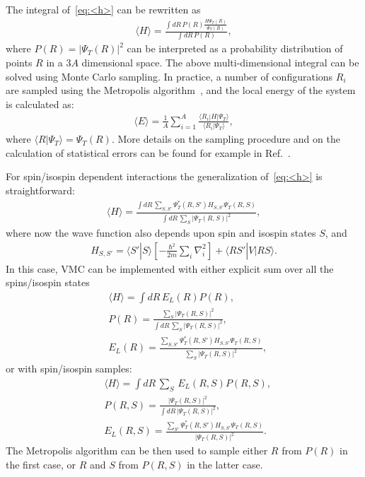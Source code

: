\documentclass[aps,prc,twocolumn,superscriptaddress,floatfix]{revtex4-1}
\newcommand{\red}[1]{\protect\textcolor{red}{#1}}
\begin{document}
The integral of~\cref{eq:<h>} can be rewritten as
\begin{align}
\langle H\rangle=\frac{\displaystyle\int dR\,P(R) \frac{H\Psi_T(R)}{\Psi_T(R)}}{\displaystyle\int dR\,P(R)} ,
\end{align}
where $P(R)=|\Psi_T(R)|^2$ can be interpreted as a probability distribution of points $R$ in a $3A$ 
dimensional space.
The above multi-dimensional integral can be solved using Monte Carlo sampling.
In practice, a number of configurations $R_i$ are sampled using the Metropolis algorithm~\cite{Metropolis:1953}, 
and the local energy of the system is calculated as:
\begin{align}
\langle E\rangle=\frac{1}{A}\sum_{i=1}^A \frac{\langle R_i|H|\Psi_T\rangle}{\langle R_i|\Psi_T\rangle} ,
\end{align}
where $\langle R|\Psi_T\rangle=\Psi_T(R)$.
More details on the sampling procedure and on the calculation of statistical errors can be found 
for example in Ref.~\red{\cite{??}}.

For spin/isospin dependent interactions the generalization of~\cref{eq:<h>} is straightforward:
\begin{align}
\langle H\rangle=\frac{\displaystyle\int dR\,\sum_{S,S'}\Psi_T^*(R,S')H_{S,S'}\Psi_T(R,S)}
{\displaystyle\int dR\,\sum_S|\Psi_T(R,S)|^2} ,
\end{align}
where now the wave function also depends upon spin and isospin states $S$, and
\begin{align}
H_{S,S'}=\langle S'|S\rangle\left[-\frac{\hbar^2}{2m}\sum_i\nabla_i^2\right]+\langle RS'|V|RS\rangle .
\end{align}
In this case, VMC can be implemented with either explicit sum over all the spins/isospin states
\begin{align}
&\langle H\rangle=\displaystyle\int dR\,E_L(R)P(R) ,\nonumber \\
&P(R)=\frac{\sum_S|\Psi_T(R,S)|^2}{\displaystyle\int dR\,\sum_S|\Psi_T(R,S)|^2} ,\nonumber \\
&E_L(R)=\frac{\sum_{S,S'}\Psi_T^*(R,S')H_{S,S'}\Psi_T(R,S)}{\sum_S|\Psi_T(R,S)|^2} ,
\end{align}
or with spin/isospin samples:
\begin{align}
&\langle H\rangle=\displaystyle\int dR\,\sum_S\,E_L(R,S)P(R,S) ,\nonumber \\
&P(R,S)=\frac{|\Psi_T(R,S)|^2}{\displaystyle\int dR\,|\Psi_T(R,S)|^2} ,\nonumber \\
&E_L(R,S)=\frac{\sum_{S'}\Psi_T^*(R,S')H_{S,S'}\Psi_T(R,S)}{|\Psi_T(R,S)|^2} .
\end{align}
The Metropolis algorithm can be then used to sample either $R$ from $P(R)$ in the first case, 
or $R$ and $S$ from $P(R,S)$ in the latter case.
\end{document}

